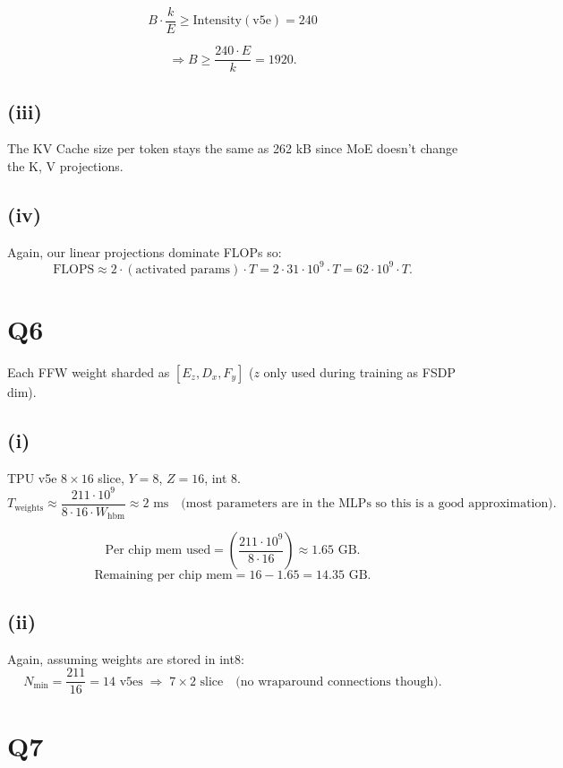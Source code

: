 \documentclass[11pt]{article}
\newcommand{\Whbm}{W_{\text{hbm}}}
\begin{document}
\[
B \cdot \frac{k}{E} \geq \text{Intensity}(\text{v5e}) = 240
\]

\[
\Rightarrow B \geq \frac{240 \cdot E}{k} = 1920.
\]

\subsection*{(iii)}

The KV Cache size per token stays the same as 262 kB since MoE doesn't change the K, V projections.

\subsection*{(iv)}

Again, our linear projections dominate FLOPs so:
\[
\text{FLOPS} \approx 2 \cdot (\text{activated params}) \cdot T = 2 \cdot 31 \cdot 10^9 \cdot T = 62 \cdot 10^9 \cdot T.
\]

\section*{Q6}

Each FFW weight sharded as $[E_z, D_x, F_y]$ ($z$ only used during training as FSDP dim).

\subsection*{(i)}

TPU v5e $8 \times 16$ slice, $Y = 8$, $Z = 16$, int 8.
\[
T_{\text{weights}} \approx \frac{211 \cdot 10^9}{8 \cdot 16 \cdot \Whbm} \approx 2 \text{ ms} \quad \text{(most parameters are in the MLPs so this is a good approximation)}.
\]

\[
\text{Per chip mem used} = \left( \frac{211 \cdot 10^9}{8 \cdot 16} \right) \approx 1.65 \text{ GB}.
\]
\[
\text{Remaining per chip mem} = 16 - 1.65 = 14.35 \text{ GB}.
\]

\subsection*{(ii)}

Again, assuming weights are stored in int8:
\[
N_{\min} = \frac{211}{16} = 14 \text{ v5es} \;\Rightarrow\; 7 \times 2 \text{ slice} \quad \text{(no wraparound connections though)}.
\]

\section*{Q7}
\end{document}
